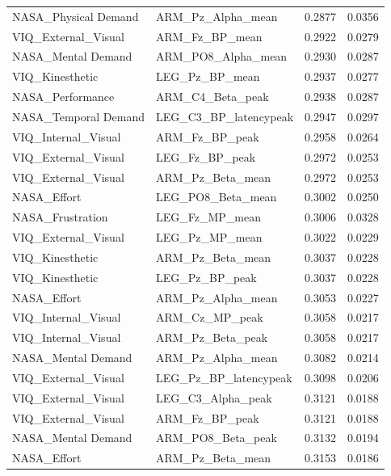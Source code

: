 \documentclass[10pt,letterpaper]{article}
\begin{document}
\begin{longtable}{@{}llll@{}}
\rowcolor[HTML]{EFEFEF} 
NASA\_Physical Demand & ARM\_Pz\_Alpha\_mean & 0.2877 & 0.0356 \\
VIQ\_External\_Visual & ARM\_Fz\_BP\_mean & 0.2922 & 0.0279 \\
\rowcolor[HTML]{EFEFEF} 
NASA\_Mental Demand & ARM\_PO8\_Alpha\_mean & 0.2930 & 0.0287 \\
VIQ\_Kinesthetic & LEG\_Pz\_BP\_mean & 0.2937 & 0.0277 \\
\rowcolor[HTML]{EFEFEF} 
NASA\_Performance & ARM\_C4\_Beta\_peak & 0.2938 & 0.0287 \\
NASA\_Temporal Demand & LEG\_C3\_BP\_latencypeak & 0.2947 & 0.0297 \\
\rowcolor[HTML]{EFEFEF} 
VIQ\_Internal\_Visual & ARM\_Fz\_BP\_peak & 0.2958 & 0.0264 \\
VIQ\_External\_Visual & LEG\_Fz\_BP\_peak & 0.2972 & 0.0253 \\
\rowcolor[HTML]{EFEFEF} 
VIQ\_External\_Visual & ARM\_Pz\_Beta\_mean & 0.2972 & 0.0253 \\
NASA\_Effort & LEG\_PO8\_Beta\_mean & 0.3002 & 0.0250 \\
\rowcolor[HTML]{EFEFEF} 
NASA\_Frustration & LEG\_Fz\_MP\_mean & 0.3006 & 0.0328 \\
VIQ\_External\_Visual & LEG\_Pz\_MP\_mean & 0.3022 & 0.0229 \\
\rowcolor[HTML]{EFEFEF} 
VIQ\_Kinesthetic & ARM\_Pz\_Beta\_mean & 0.3037 & 0.0228 \\
VIQ\_Kinesthetic & LEG\_Pz\_BP\_peak & 0.3037 & 0.0228 \\
\rowcolor[HTML]{EFEFEF} 
NASA\_Effort & ARM\_Pz\_Alpha\_mean & 0.3053 & 0.0227 \\
VIQ\_Internal\_Visual & ARM\_Cz\_MP\_peak & 0.3058 & 0.0217 \\
\rowcolor[HTML]{EFEFEF} 
VIQ\_Internal\_Visual & ARM\_Pz\_Beta\_peak & 0.3058 & 0.0217 \\
NASA\_Mental Demand & ARM\_Pz\_Alpha\_mean & 0.3082 & 0.0214 \\
\rowcolor[HTML]{EFEFEF} 
VIQ\_External\_Visual & LEG\_Pz\_BP\_latencypeak & 0.3098 & 0.0206 \\
VIQ\_External\_Visual & LEG\_C3\_Alpha\_peak & 0.3121 & 0.0188 \\
\rowcolor[HTML]{EFEFEF} 
VIQ\_External\_Visual & ARM\_Fz\_BP\_peak & 0.3121 & 0.0188 \\
NASA\_Mental Demand & ARM\_PO8\_Beta\_peak & 0.3132 & 0.0194 \\
\rowcolor[HTML]{EFEFEF} 
NASA\_Effort & ARM\_Pz\_Beta\_mean & 0.3153 & 0.0186 \\

\end{longtable}
\end{document}
